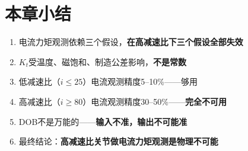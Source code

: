 \section*{本章小结}

\begin{summarybox}{}
\begin{enumerate}
  \item 电流力矩观测依赖三个假设，\textbf{在高减速比下三个假设全部失效}
  \item $K_t$受温度、磁饱和、制造公差影响，\textbf{不是常数}
  \item 低减速比（$i \leq 25$）电流观测精度5--10\%——够用
  \item 高减速比（$i \geq 80$）电流观测精度30--50\%——\textbf{完全不可用}
  \item DOB不是万能的——\textbf{输入不准，输出不可能准}
  \item 最终结论：\textbf{高减速比关节做电流力矩观测是物理不可能}
\end{enumerate}
\end{summarybox}

\newpage
